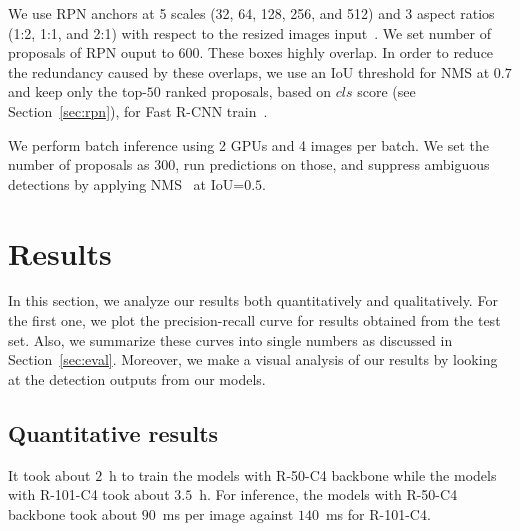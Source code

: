 We use RPN anchors at 5 scales (32, 64, 128, 256, and 512) and 3 aspect ratios (1:2, 1:1, and 2:1) with respect to the resized images input~\cite{Lin2017pyramid}.
We set number of proposals of RPN ouput to $600$.
These boxes highly overlap.
In order to reduce the redundancy caused by these overlaps,
we use an IoU threshold for NMS at $0.7$ and keep only the top-$50$ ranked proposals, based on $cls$ score (see Section~\ref{sec:rpn}), for Fast R-CNN train~\cite{Ren2017fasterpami}.

We perform batch inference using 2 GPUs and 4 images per batch.
We set the number of proposals as 300, run predictions on those, and suppress ambiguous detections by applying NMS~\cite{Girshick2015DPM} at IoU=$0.5$.

\section{Results}
%
In this section, we analyze our results both quantitatively and qualitatively.
For the first one, we plot the precision-recall curve for results obtained from the test set.
Also, we summarize these curves into single numbers as discussed in Section~\ref{sec:eval}.
Moreover, we make a visual analysis of our results by looking at the detection outputs from our models.


\subsection{Quantitative results}
%
It took about $2$~h to train the models with R-50-C4 backbone while the models with R-101-C4 took about $3.5$~h.
For inference, the models with R-50-C4 backbone took about $90$~ms per image against $140$~ms for R-101-C4.
%

